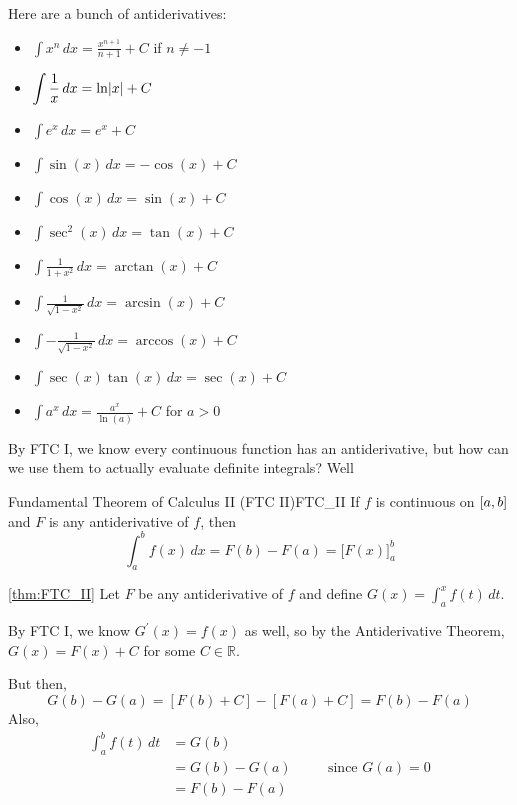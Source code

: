 Here are a bunch of antiderivatives:
\begin{itemize}
    \item $ \displaystyle \int x^n\, d{x}=\frac{x^{n+1}}{n+1}+C $ if $ n\neq -1 $
    \item $ \displaystyle \int \frac{1}{x}\, d{x}=\ln\lvert x\rvert+C $
    \item $ \displaystyle \int e^x\,d{x}=e^x+C $
    \item $ \displaystyle \int \sin(x)\,d{x}=-\cos(x)+C $
    \item $ \displaystyle \int \cos(x)\,d{x}=\sin(x)+C $
    \item $ \displaystyle \int \sec^2(x)\,d{x}=\tan(x)+C $
    \item $ \displaystyle \int \frac{1}{1+x^2}\,d{x}=\arctan(x)+C $
    \item $ \displaystyle \int \frac{1}{\sqrt{1-x^2}}\,d{x}=\arcsin(x)+C $
    \item $ \displaystyle \int -\frac{1}{\sqrt{1-x^2}}\, d{x}=\arccos(x)+C $
    \item $ \displaystyle \int \sec(x)\tan(x)\,d{x}=\sec(x)+C $
    \item $ \displaystyle \int a^x\,d{x}=\frac{a^x}{\ln(a)}+C $ for $ a>0 $
\end{itemize}

By FTC I, we know every continuous function has an antiderivative,
but how can we use them to actually evaluate definite integrals?
Well\textellipsis{}

\begin{Theorem}{Fundamental Theorem of Calculus II (FTC II)}{FTC_II}
    If $ f $ is continuous on $ \interval{a}{b} $ and $ F $
    is any antiderivative of $ f $, then
    \[ \int_{a}^{b} f(x)\, d{x} =F(b)-F(a)
        =\bigl[F(x)\bigr]_{a}^b \]
\end{Theorem}

\begin{Proof}{\ref{thm:FTC_II}}{}
    Let $ F $ be any antiderivative of $ f $ and define
    $ \displaystyle G(x)=\int_{a}^{x} f(t)\, d{t} $.

    By FTC I, we know $ G^\prime(x)=f(x) $ as well, so by the
    Antiderivative Theorem, $ G(x)=F(x)+C $ for some $ C\in\mathbb{R} $.

    But then,
    \[ G(b)-G(a)=[F(b)+C]-[F(a)+C]=F(b)-F(a) \]
    Also,
    \begin{align*}
        \int_{a}^{b} f(t)\, d{t}
         & =G(b)                                    \\
         & =G(b)-G(a) & \quad & \text{since }G(a)=0 \\
         & =F(b)-F(a)
    \end{align*}
\end{Proof}

